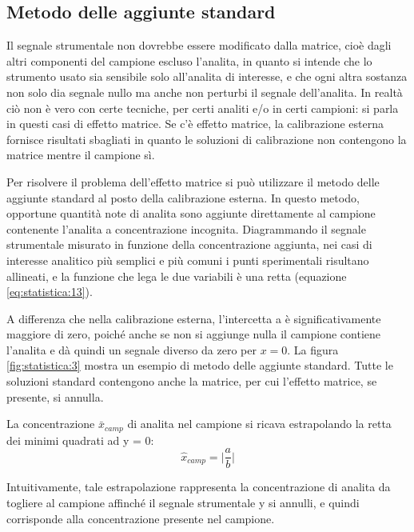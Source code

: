 \subsection{Metodo delle aggiunte standard}

Il segnale strumentale non dovrebbe essere modificato dalla matrice, cioè dagli altri componenti del campione escluso l'analita, in quanto si intende che lo strumento usato sia sensibile solo all'analita di interesse, e che ogni altra sostanza non solo dia segnale nullo ma anche non perturbi il segnale dell'analita. In realtà ciò non è vero con certe tecniche, per certi analiti e/o in certi campioni: si parla in questi casi di effetto matrice. Se c'è effetto matrice, la calibrazione esterna fornisce risultati sbagliati in quanto le soluzioni di calibrazione non contengono la matrice mentre il campione sì.

Per risolvere il problema dell'effetto matrice si può utilizzare il metodo delle aggiunte standard al posto della calibrazione esterna. In questo metodo, opportune quantità note di analita sono aggiunte direttamente al campione contenente l'analita a concentrazione incognita. Diagrammando il segnale strumentale misurato in funzione della concentrazione aggiunta, nei casi di interesse analitico più semplici e più comuni i punti sperimentali risultano allineati, e la funzione che lega le due variabili è una retta (equazione \ref{eq:statistica:13}).

A differenza che nella calibrazione esterna, l'intercetta a è significativamente maggiore di zero, poiché anche se non si aggiunge nulla il campione contiene l'analita e dà quindi un segnale diverso da zero per $x = 0$. La figura \ref{fig:statistica:3} mostra un esempio di metodo delle aggiunte standard. Tutte le soluzioni standard contengono anche la matrice, per cui l'effetto matrice, se presente, si annulla.


La concentrazione $\bar{x}_{camp}$ di analita nel campione si ricava estrapolando la retta dei minimi quadrati ad y = 0:
\begin{equation} \label{eq:statistica:16}
\hat{x}_{camp} = \biggl|\frac{a}{b}\biggr|
\end{equation}



Intuitivamente, tale estrapolazione rappresenta la concentrazione di analita da togliere al campione affinché il segnale strumentale y si annulli, e quindi corrisponde alla concentrazione presente nel campione.

